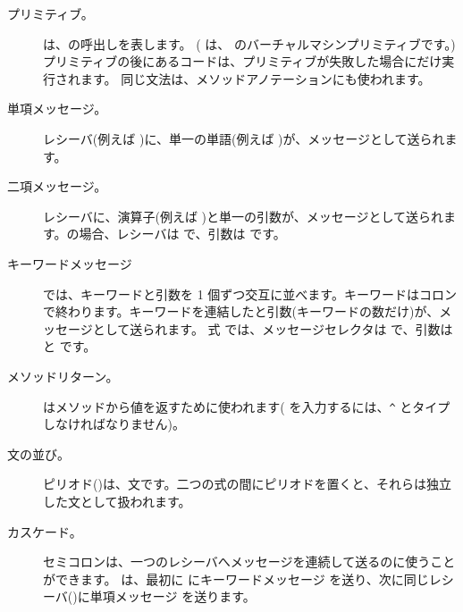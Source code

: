 \documentclass[a4paper,10pt,twoside]{book}
\begin{document}
\begin{description}
\item[プリミティブ。] は、の呼出しを表します。
	( は、 のバーチャルマシンプリミティブです。)
	プリミティブの後にあるコードは、プリミティブが失敗した場合にだけ実行されます。
	同じ文法は、メソッドアノテーションにも使われます。

\item[単項メッセージ。] レシーバ(例えば )に、単一の単語(例えば )が、メッセージとして送られます。

\item[二項メッセージ。] レシーバに、演算子(例えば \ct{+})と単一の引数が、メッセージとして送られます。の場合、レシーバは  で、引数は  です。

\item[キーワードメッセージ] では、キーワードと引数を 1 個ずつ交互に並べます。キーワードはコロンで終わります。キーワードを連結したと引数(キーワードの数だけ)が、メッセージとして送られます。
式  では、メッセージセレクタは  で、引数は  と  です。

\item[メソッドリターン。] \ct{^}はメソッドから値を返すために使われます(\ct{^} を入力するには、\verb|^| とタイプしなければなりません)。

\item[文の並び。] ピリオド()は、文です。二つの式の間にピリオドを置くと、それらは独立した文として扱われます。

\item[カスケード。] セミコロンは、一つのレシーバへメッセージを連続して送るのに使うことができます。 は、最初に  にキーワードメッセージ  を送り、次に同じレシーバ()に単項メッセージ  を送ります。

\end{description}
\end{document}
